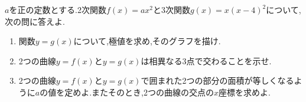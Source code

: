 \begin{problem}
$a$を正の定数とする.2次関数$f(x)=ax^2$と3次関数$g(x)=x(x-4)^2$について,次の問に答えよ.
  \begin{enumerate}
    \item 関数$y=g(x)$について,極値を求め,そのグラフを描け.
    \item 2つの曲線$y=f(x)$と$y=g(x)$は相異なる3点で交わることを示せ.
    \item 2つの曲線$y=f(x)$と$y=g(x)$で囲まれた2つの部分の面積が等しくなるように$a$の値を定めよ.またそのとき,2つの曲線の交点の$x$座標を求めよ.
  \end{enumerate}
\end{problem}
